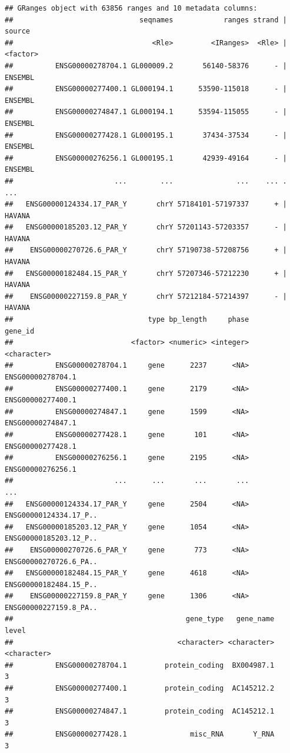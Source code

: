 \documentclass[
]{article}
\begin{document}
\begin{verbatim}
## GRanges object with 63856 ranges and 10 metadata columns:
##                              seqnames            ranges strand |   source
##                                 <Rle>         <IRanges>  <Rle> | <factor>
##          ENSG00000278704.1 GL000009.2       56140-58376      - |  ENSEMBL
##          ENSG00000277400.1 GL000194.1      53590-115018      - |  ENSEMBL
##          ENSG00000274847.1 GL000194.1      53594-115055      - |  ENSEMBL
##          ENSG00000277428.1 GL000195.1       37434-37534      - |  ENSEMBL
##          ENSG00000276256.1 GL000195.1       42939-49164      - |  ENSEMBL
##                        ...        ...               ...    ... .      ...
##   ENSG00000124334.17_PAR_Y       chrY 57184101-57197337      + |   HAVANA
##   ENSG00000185203.12_PAR_Y       chrY 57201143-57203357      - |   HAVANA
##    ENSG00000270726.6_PAR_Y       chrY 57190738-57208756      + |   HAVANA
##   ENSG00000182484.15_PAR_Y       chrY 57207346-57212230      + |   HAVANA
##    ENSG00000227159.8_PAR_Y       chrY 57212184-57214397      - |   HAVANA
##                                type bp_length     phase                gene_id
##                            <factor> <numeric> <integer>            <character>
##          ENSG00000278704.1     gene      2237      <NA>      ENSG00000278704.1
##          ENSG00000277400.1     gene      2179      <NA>      ENSG00000277400.1
##          ENSG00000274847.1     gene      1599      <NA>      ENSG00000274847.1
##          ENSG00000277428.1     gene       101      <NA>      ENSG00000277428.1
##          ENSG00000276256.1     gene      2195      <NA>      ENSG00000276256.1
##                        ...      ...       ...       ...                    ...
##   ENSG00000124334.17_PAR_Y     gene      2504      <NA> ENSG00000124334.17_P..
##   ENSG00000185203.12_PAR_Y     gene      1054      <NA> ENSG00000185203.12_P..
##    ENSG00000270726.6_PAR_Y     gene       773      <NA> ENSG00000270726.6_PA..
##   ENSG00000182484.15_PAR_Y     gene      4618      <NA> ENSG00000182484.15_P..
##    ENSG00000227159.8_PAR_Y     gene      1306      <NA> ENSG00000227159.8_PA..
##                                         gene_type   gene_name       level
##                                       <character> <character> <character>
##          ENSG00000278704.1         protein_coding  BX004987.1           3
##          ENSG00000277400.1         protein_coding  AC145212.2           3
##          ENSG00000274847.1         protein_coding  AC145212.1           3
##          ENSG00000277428.1               misc_RNA       Y_RNA           3

\end{verbatim}
\end{document}
